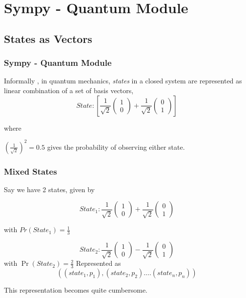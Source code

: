 \documentclass[dvips]{beamer}
\begin{document}
\section{Sympy - Quantum Module}
\subsection { States as Vectors }
\begin{frame}
\frametitle{Sympy - Quantum Module}

Informally , in quantum mechanics, \emph{states} in a closed system are
represented as linear combination of a set of basis vectors,
\newline
\[State: \left[
\frac{1}{\sqrt{2}} \left( \begin{matrix} 1 \\ 0 \end{matrix} \right)
+ \frac{1}{\sqrt{2}}
\left( \begin{matrix}  0 \\ 1 \end{matrix} \right)
\right]\]

where \newline

${(\frac{1}{\sqrt{2}})}^2 = 0.5$ gives the probability of observing either state.


\end{frame}


\begin{frame}
\frametitle{Mixed States}

Say we have 2 states, given by

\[
State_1 : \frac{1}{\sqrt{2}} \left( \begin{smallmatrix} 1 \\ 0 \end{smallmatrix} \right)
+ \frac{1}{\sqrt{2}}
\left( \begin{smallmatrix}  0 \\ 1 \end{smallmatrix} \right)
\]

with $Pr(State_1)=\frac{1}{3}$

\[ State_2:
\frac{1}{\sqrt{2}} \left( \begin{smallmatrix} 1 \\ 0 \end{smallmatrix} \right)
- \frac{1}{\sqrt{2}}
\left( \begin{smallmatrix}  0 \\ 1 \end{smallmatrix} \right)
\]
with $\Pr(State_2) = \frac{2}{3}$
\newline\newline\newline
\pause
\small{Represented as} \[\left( (state_1, p_1), (state_2,p_2)....(state_n,p_n) \right)\]

This representation becomes quite cumbersome.

\end{frame}
\end{document}

